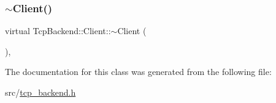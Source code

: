 \subsubsection{\texorpdfstring{$\sim$\+Client()}{~Client()}}
{\footnotesize\ttfamily virtual Tcp\+Backend\+::\+Client\+::$\sim$\+Client (\begin{DoxyParamCaption}{ }\end{DoxyParamCaption})\hspace{0.3cm}{\ttfamily [virtual]}, {\ttfamily [default]}}



The documentation for this class was generated from the following file\+:\begin{DoxyCompactItemize}
\item 
src/\hyperlink{tcp__backend_8h}{tcp\+\_\+backend.\+h}\end{DoxyCompactItemize}
